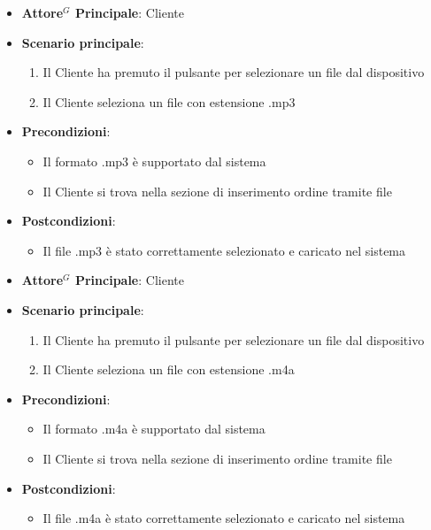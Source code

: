 \begin{itemize}
    \item \textbf{Attore$^G$ Principale}: Cliente
    \item \textbf{Scenario principale}:
        \begin{enumerate}
            \item Il Cliente ha premuto il pulsante per selezionare un file dal dispositivo
            \item Il Cliente seleziona un file con estensione .mp3
        \end{enumerate}
    \item \textbf{Precondizioni}:
        \begin{itemize}
            \item Il formato .mp3 è supportato dal sistema
            \item Il Cliente si trova nella sezione di inserimento ordine tramite file
        \end{itemize}
    \item \textbf{Postcondizioni}: 
        \begin{itemize}
            \item Il file .mp3 è stato correttamente selezionato e caricato nel sistema
        \end{itemize}
\end{itemize}

\label{uc_13.2.2}

\begin{itemize}
    \item \textbf{Attore$^G$ Principale}: Cliente
    \item \textbf{Scenario principale}:
        \begin{enumerate}
            \item Il Cliente ha premuto il pulsante per selezionare un file dal dispositivo
            \item Il Cliente seleziona un file con estensione .m4a
        \end{enumerate}
    \item \textbf{Precondizioni}:
        \begin{itemize}
            \item Il formato .m4a è supportato dal sistema
            \item Il Cliente si trova nella sezione di inserimento ordine tramite file
        \end{itemize}
    \item \textbf{Postcondizioni}: 
        \begin{itemize}
            \item Il file .m4a è stato correttamente selezionato e caricato nel sistema
        \end{itemize}
\end{itemize}

